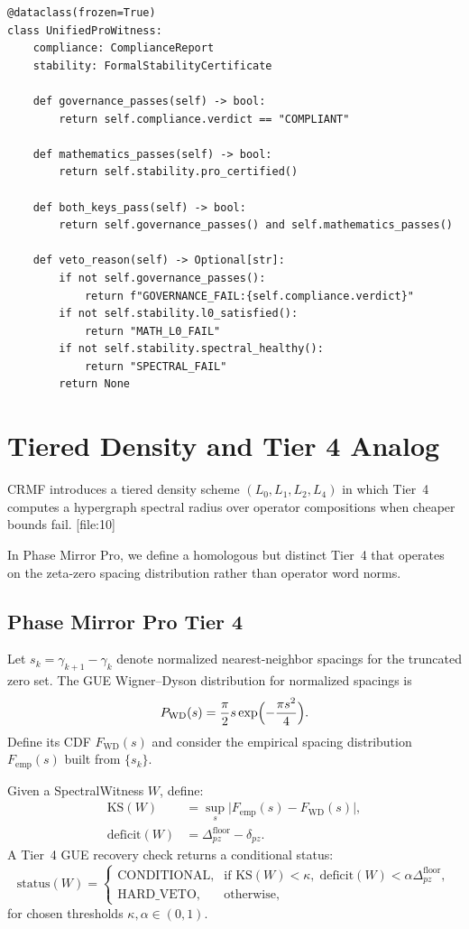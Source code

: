 \documentclass[11pt]{article}
\begin{document}
\begin{verbatim}
@dataclass(frozen=True)
class UnifiedProWitness:
    compliance: ComplianceReport
    stability: FormalStabilityCertificate

    def governance_passes(self) -> bool:
        return self.compliance.verdict == "COMPLIANT"

    def mathematics_passes(self) -> bool:
        return self.stability.pro_certified()

    def both_keys_pass(self) -> bool:
        return self.governance_passes() and self.mathematics_passes()

    def veto_reason(self) -> Optional[str]:
        if not self.governance_passes():
            return f"GOVERNANCE_FAIL:{self.compliance.verdict}"
        if not self.stability.l0_satisfied():
            return "MATH_L0_FAIL"
        if not self.stability.spectral_healthy():
            return "SPECTRAL_FAIL"
        return None
\end{verbatim}

\section{Tiered Density and Tier 4 Analog}

CRMF introduces a tiered density scheme $(L_0,L_1,L_2,L_4)$ in which
Tier~4 computes a hypergraph spectral radius over operator compositions
when cheaper bounds fail.%
[file:10]

In Phase Mirror Pro, we define a homologous but distinct Tier~4 that
operates on the zeta-zero spacing distribution rather than operator word
norms.

\subsection{Phase Mirror Pro Tier 4}

Let $s_k = \gamma_{k+1}-\gamma_k$ denote normalized nearest-neighbor
spacings for the truncated zero set. The GUE Wigner--Dyson distribution
for normalized spacings is
\[
  P_{\mathrm{WD}}(s) = \frac{\pi}{2}s \exp\Bigl(-\frac{\pi s^2}{4}\Bigr).
\]
Define its CDF $F_{\mathrm{WD}}(s)$ and consider the empirical spacing
distribution $F_{\mathrm{emp}}(s)$ built from $\{s_k\}$.

\begin{definition}
Given a SpectralWitness $W$, define:
\begin{align*}
  \mathrm{KS}(W) &= \sup_{s}
    \bigl| F_{\mathrm{emp}}(s) - F_{\mathrm{WD}}(s) \bigr|,\\
  \mathrm{deficit}(W) &= \Delta_{pz}^{\mathrm{floor}} - \delta_{pz}.
\end{align*}
A Tier~4 GUE recovery check returns a conditional status:
\[
  \mathrm{status}(W)
  =
  \begin{cases}
    \text{CONDITIONAL}, & \text{if }\mathrm{KS}(W) < \kappa,\;
                           \mathrm{deficit}(W) < \alpha \Delta_{pz}^{\mathrm{floor}},\\
    \text{HARD\_VETO}, & \text{otherwise},
  \end{cases}
\]
for chosen thresholds $\kappa,\alpha \in (0,1)$.
\end{definition}
\end{document}
